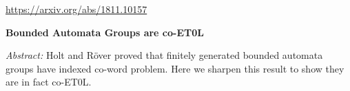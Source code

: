 \documentclass[11pt]{beamer}
\begin{document}
\begin{frame}
\begin{center}
	{\LARGE
	
	\url{https://arxiv.org/abs/1811.10157}
	
}
\pause
\vspace{1.5cm}
	
	\textbf{\Large Bounded Automata Groups are co-ET0L}
	
\end{center}
	{
		\textit{Abstract:}
		Holt and R\"over proved that finitely generated bounded automata groups have indexed co-word problem. Here we sharpen this result to show they are in fact co-ET0L.
	}
	
	
%		
%		
%		
%		
\end{frame}


%
%
%
%
%
%
%
%
\end{document}
